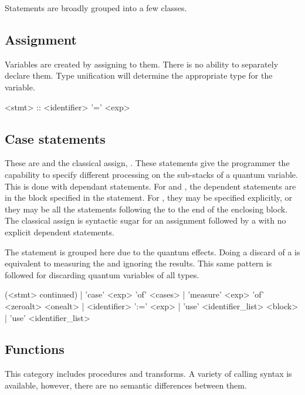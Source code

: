 Statements are broadly grouped into a few classes.
\subsection{Assignment} 
Variables are created by assigning to them. There is no 
ability to separately declare them. Type unification will determine the
appropriate type for the variable.

\begin{singlespace}
\begin{bnf}   
   <stmt> :: <identifier> '=' <exp>
\end{bnf}
\end{singlespace}

\subsection{Case statements} 
These are  and
the classical assign, \inlqpl{:=}. 
These statements give the programmer the capability to
specify different processing on the sub-stacks of
a quantum variable. This is done with dependant statements. 
For   
and ,
the dependent statements are in the block specified in the 
statement. For , they may be
specified explicitly, or they may be all the 
statements following the  to the end
of the enclosing block. The classical assign is syntactic sugar for an
assignment followed by a  with no explicit dependent statements.

The  statement is grouped here due to the quantum effects.
Doing a discard of a \qubit{} is equivalent to measuring the \qubit{} and 
ignoring the results. This same pattern is followed for discarding 
quantum variables of all types.

\begin{singlespace}
\begin{bnf} 
   (<stmt> continued)    
        | 'case' <exp> 'of' <cases>  
        | 'measure' <exp> 'of' <zeroalt> <onealt> 
	| <identifier> ':=' <exp>
        | 'use' <identifier_list> <block>
        | 'use' <identifier_list> 
\end{bnf}
\end{singlespace}

\subsection{Functions} 
This category includes procedures and
transforms. A variety of calling syntax is available, however, there
are no semantic differences between them.


